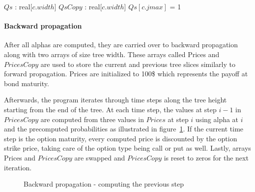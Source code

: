 {
\setlength{\interspacetitleruled}{-.4pt}%
\begin{algorithm}[H]
    \DontPrintSemicolon
    \setcounter{AlgoLine}{16}
    
    \;
    $Qs$ : real[$c.width$]\;
    $QsCopy$ : real[$c.width$]\;
    $Qs[c.jmax]$ = 1 
    \;
\end{algorithm}
}

\pagebreak
\paragraph{Backward propagation}
After all alphas are computed, they are carried over to backward propagation along with two arrays of size tree width. These arrays called Prices and $PricesCopy$ are used to store the current and previous tree slices similarly to forward propagation. Prices are initialized to 100\$ which represents the payoff at bond maturity.

Afterwards, the program iterates through time steps along the tree height starting from the end of the tree. At each time step, the values at step $i-1$ in $PricesCopy$ are computed from three values in $Prices$ at step $i$ using alpha at $i$ and the precomputed probabilities as illustrated in figure~\ref{fig:seqbackward}. If the current time step is the option maturity, every computed price is discounted by the option strike price, taking care of the option type being call or put as well. Lastly, arrays Prices and $PricesCopy$ are swapped and $PricesCopy$ is reset to zeros for the next iteration.

\begin{figure}[H]
    \centering
    \def\svgwidth{0.5\textwidth}
	\caption{Backward propagation - computing the previous step}
    
	\label{fig:seqbackward}
\end{figure}


